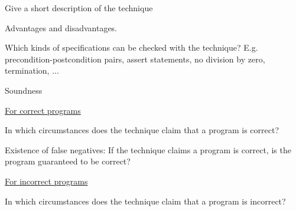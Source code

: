 \documentclass[a4paper]{article}
\begin{document}
\begin{minipage}[t]{0.16\linewidth}
	\raggedright
	\begin{betterlist}
		\item Give a short description of the technique
    \item Advantages and disadvantages.
		\item Which kinds of specifications can be checked with the technique? E.g. precondition-postcondition pairs, assert statements, no division by zero, termination, ...

		\item \alert{Soundness}
		\begin{betterlist}
			\item \underline{For correct programs}
			\begin{betterlist}
				\item In which circumstances does the technique claim that a program is correct?

				\item Existence of false negatives: If the technique claims a program is correct, is the program guaranteed to be correct?

			\end{betterlist}
			\item \underline{For incorrect programs}
			\begin{betterlist}
				\item In which circumstances does the technique claim that a program is incorrect?


\end{betterlist}
\end{betterlist}
\end{betterlist}
\end{minipage}
\end{document}
